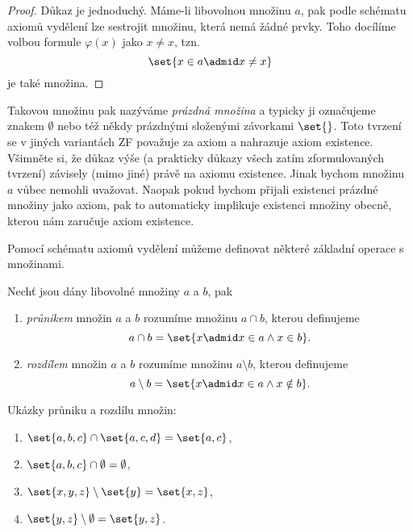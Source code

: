 \begin{proof}
    Důkaz je jednoduchý. Máme-li libovolnou množinu $a$, pak podle schématu axiomů vydělení lze sestrojit množinu, která nemá žádné prvky. Toho docílíme volbou formule $\varphi(x)$ jako $x\neq x$, tzn.
    \begin{equation*}
        \set{x\in a \admid x\neq x}
    \end{equation*}
    je také množina.
\end{proof}
Takovou množinu pak nazýváme \emph{prázdná množina} a typicky ji označujeme znakem $\emptyset$ nebo též někdy prázdnými složenými závorkami $\set{}$. Toto tvrzení se v jiných variantách \textsf{ZF} považuje za axiom a nahrazuje axiom existence. Všimněte si, že důkaz výše (a prakticky důkazy všech zatím zformulovaných tvrzení) závisely (mimo jiné) právě na axiomu existence. Jinak bychom množinu $a$ vůbec nemohli uvažovat. Naopak pokud bychom přijali existenci prázdné množiny jako axiom, pak to automaticky implikuje existenci množiny obecně, kterou nám zaručuje axiom existence.\par
Pomocí schématu axiomů vydělení můžeme definovat některé základní operace s množinami.
\begin{definition}\label{def:prunik_rozdil}
    Nechť jsou dány libovolné množiny $a$ a $b$, pak
    \begin{enumerate}[label=(\roman*)]
        \item \emph{průnikem} množin $a$ a $b$ rozumíme množinu $a \cap b$, kterou definujeme
        \begin{equation*}
            a\cap b=\set{x \admid x\in a \land x\in b}.
        \end{equation*}
        \item \emph{rozdílem} množin $a$ a $b$ rozumíme množinu $a \setminus b$, kterou definujeme
        \begin{equation*}
            a\setminus b=\set{x \admid x\in a \land x\notin b}.
        \end{equation*}
    \end{enumerate}
\end{definition}
\begin{example}
    Ukázky průniku a rozdílu množin:
    \begin{enumerate}[label=(\roman*)]
        \item $\set{a,b,c}\cap\set{a,c,d}=\set{a,c}$,
        \item $\set{a,b,c}\cap\emptyset=\emptyset$,
        \item $\set{x,y,z}\setminus\set{y}=\set{x,z}$,
        \item $\set{y,z}\setminus\emptyset=\set{y,z}$.
    \end{enumerate}
\end{example}
